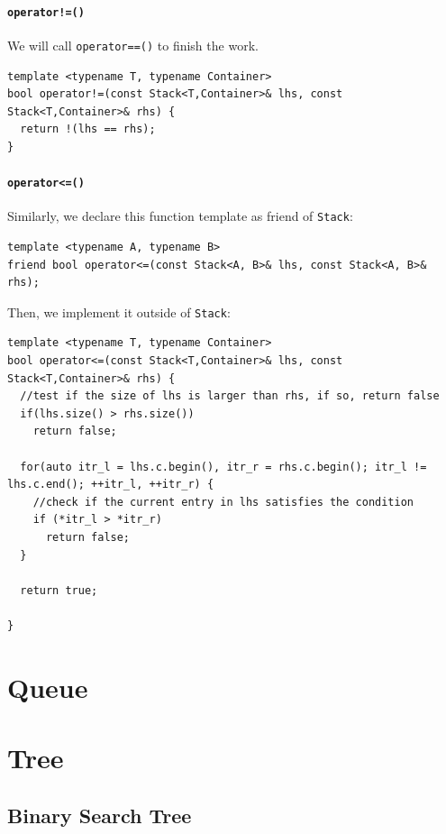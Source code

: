 \documentclass[12pt]{book}
\begin{document}
\subsubsection{\texttt{operator!=()}}
\label{sec:org2b6852d}
We will call \texttt{operator==()} to finish the work.
\begin{verbatim}
template <typename T, typename Container>
bool operator!=(const Stack<T,Container>& lhs, const Stack<T,Container>& rhs) {
  return !(lhs == rhs);
}
\end{verbatim}
\subsubsection{\texttt{operator<=()}}
\label{sec:org4afa985}
Similarly, we declare this function template as friend of \texttt{Stack}:
\begin{verbatim}
template <typename A, typename B>
friend bool operator<=(const Stack<A, B>& lhs, const Stack<A, B>& rhs);
\end{verbatim}

Then, we implement it outside of \texttt{Stack}:
\begin{verbatim}
template <typename T, typename Container>
bool operator<=(const Stack<T,Container>& lhs, const Stack<T,Container>& rhs) {
  //test if the size of lhs is larger than rhs, if so, return false
  if(lhs.size() > rhs.size())
    return false;

  for(auto itr_l = lhs.c.begin(), itr_r = rhs.c.begin(); itr_l != lhs.c.end(); ++itr_l, ++itr_r) {
    //check if the current entry in lhs satisfies the condition
    if (*itr_l > *itr_r)
      return false;
  }

  return true;

}
\end{verbatim}

\chapter{Queue}
\label{sec:org6327b06}
\chapter{Tree}
\label{sec:orgb47daf6}
\section{Binary Search Tree}
\label{sec:org5cd786c}
\end{document}
